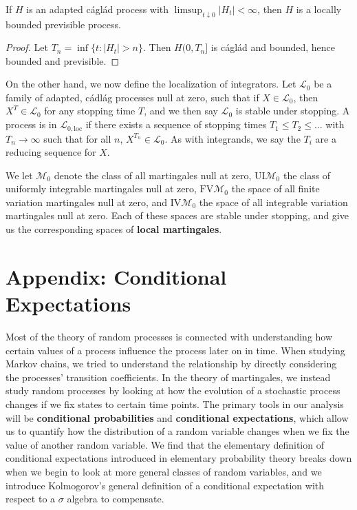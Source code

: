 \begin{lemma}
    If $H$ is an adapted c\'{a}gl\'{a}d process with $\limsup_{t \downarrow 0} |H_t| < \infty$, then $H$ is a locally bounded previsible process.
\end{lemma}
\begin{proof}
    Let $T_n = \inf \{ t: |H_t| > n \}$. Then $H(0,T_n]$ is c\'{a}gl\'{a}d and bounded, hence bounded and previsible.
\end{proof}

On the other hand, we now define the localization of integrators. Let $\mathcal{L}_0$ be a family of adapted, c\'{a}dl\'{a}g processes null at zero, such that if $X \in \mathcal{L}_0$, then $X^T \in \mathcal{L}_0$ for any stopping time $T$, and we then say $\mathcal{L}_0$ is stable under stopping. A process is in $\mathcal{L}_{0,\text{loc}}$ if there exists a sequence of stopping times $T_1 \leq T_2 \leq \dots$ with $T_n \to \infty$ such that for all $n$, $X^{T_n} \in \mathcal{L}_0$. As with integrands, we say the $T_i$ are a reducing sequence for $X$.

\begin{example}
    We let $\mathcal{M}_0$ denote the class of all martingales null at zero, $\text{UI} \mathcal{M}_0$ the class of uniformly integrable martingales null at zero, $\text{FV} \mathcal{M}_0$ the space of all finite variation martingales null at zero, and $\text{IV} \mathcal{M}_0$ the space of all integrable variation martingales null at zero. Each of these spaces are stable under stopping, and give us the corresponding spaces of {\bf local martingales}.
\end{example}














\chapter{Appendix: Conditional Expectations}

Most of the theory of random processes is connected with understanding how certain values of a process influence the process later on in time. When studying Markov chains, we tried to understand the relationship by directly considering the processes' transition coefficients. In the theory of martingales, we instead study random processes by looking at how the evolution of a stochastic process changes if we fix states to certain time points. The primary tools in our analysis will be {\bf conditional probabilities} and {\bf conditional expectations}, which allow us to quantify how the distribution of a random variable changes when we fix the value of another random variable. We find that the elementary definition of conditional expectations introduced in elementary probability theory breaks down when we begin to look at more general classes of random variables, and we introduce Kolmogorov's general definition of a conditional expectation with respect to a $\sigma$ algebra to compensate.

